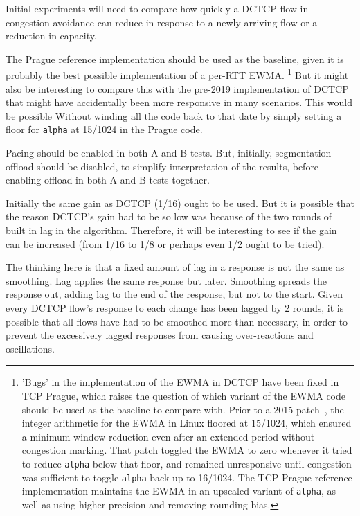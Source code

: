 Initial experiments will need to compare how quickly a DCTCP flow in congestion
avoidance can reduce in response to a newly arriving flow or a reduction in
capacity.

The Prague reference implementation should be used as the baseline, given it is
probably the best possible implementation of a per-RTT EWMA.%
%
\footnote{'Bugs' in the implementation of the EWMA in DCTCP have been fixed in
	TCP Prague, which raises the question of which variant of the EWMA code should
	be used as the baseline to compare with. Prior to a 2015
	patch~\cite{shewmaker15:Linux_DCTCP_EWMA}, the integer arithmetic for the EWMA
	in Linux floored at 15/1024, which ensured a minimum window reduction even after
	an extended period without congestion marking. That patch toggled the EWMA to
	zero whenever it tried to reduce \texttt{alpha} below that floor, and remained
	unresponsive until congestion was sufficient to toggle \texttt{alpha} back up to
	16/1024. The TCP Prague reference implementation maintains the EWMA in an
	upscaled variant of \texttt{alpha}, as well as using higher precision and
	removing rounding bias.}%
%
But it might also be interesting to compare this with the pre-2019
implementation of DCTCP that might have accidentally been more responsive in
many scenarios. This would be possible Without winding all the code back to that
date by simply setting a floor for \texttt{alpha} at 15/1024 in the Prague code.

Pacing should be enabled in both A and B tests. But, initially, segmentation
offload should be disabled, to simplify interpretation of the results, before
enabling offload in both A and B tests together.

Initially the same gain as DCTCP (1/16) ought to be used. But it is possible
that the reason DCTCP's gain had to be so low was because of the two rounds of
built in lag in the algorithm. Therefore, it will be interesting to see if the
gain can be increased (from 1/16 to 1/8 or perhaps even 1/2 ought to be tried).

The thinking here is that a fixed amount of lag in a response is not the same as
smoothing. Lag applies the same response but later. Smoothing spreads the
response out, adding lag to the end of the response, but not to the start. Given
every DCTCP flow's response to each change has been lagged by 2 rounds, it is
possible that all flows have had to be smoothed more than necessary, in order to
prevent the excessively lagged responses from causing over-reactions and
oscillations.

